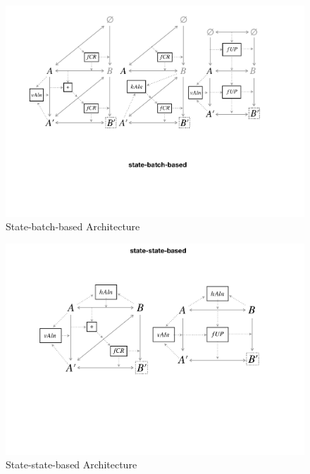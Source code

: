 \begin{figure}[tb!]
	\centering
	\includegraphics[width=\columnwidth]{diagrams/foundations//state-batch-based}
	\caption{State-batch-based Architecture}
	\label{fig:stateBatchBased}
\end{figure}

\begin{figure}[tb!]
	\centering
	\includegraphics[width=\columnwidth]{diagrams/foundations//state-state-based}
	\caption{State-state-based Architecture}
	\label{fig:stateStateBased}
\end{figure}

